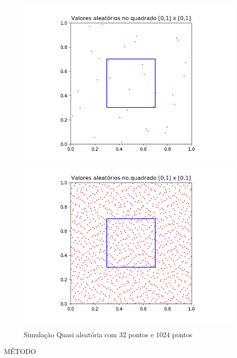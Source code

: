 \documentclass[a4paper, 12pt]{article}
\begin{document}
  
  \begin{figure}[h]
  \centering
  \includegraphics[scale=0.35]{quasi5.png} 
  \includegraphics[scale=0.35]{quasi10.png}  
  \caption{Simulação Quasi aleatória com 32 pontos e 1024 pontos}
  \label{figura:quasi5}
  \end{figure}  

\textsc{MÉTODO}
\newline
 
\end{document}
